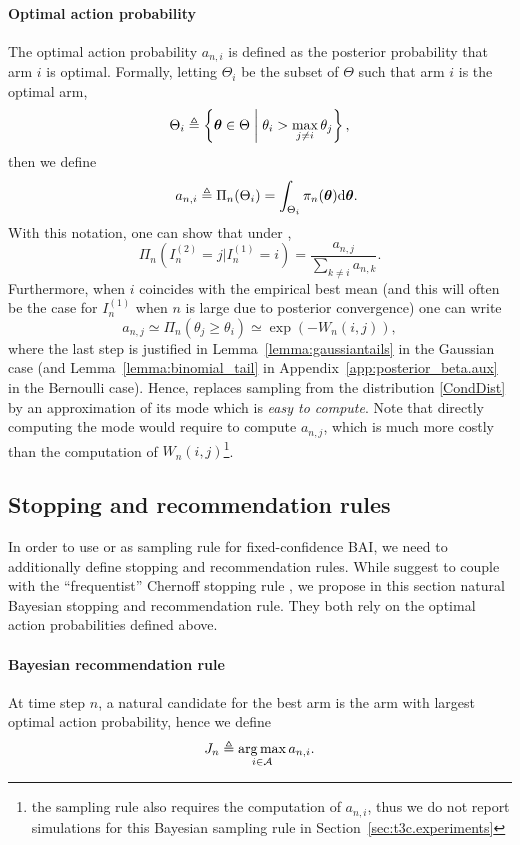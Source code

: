 \paragraph{Optimal action probability} The optimal action probability $a_{n,i}$ is defined as the posterior probability that arm $i$ is optimal. Formally, letting $\Theta_i$ be the subset of $\Theta$ such that arm $i$ is the optimal arm,
\[
    \Theta_i \triangleq \left\{ {\boldsymbol \theta}\in\Theta \biggm| \theta_i > \max_{j\neq i}\theta_j \right\},
\]
then we define
\[
   \quad a_{n,i} \triangleq \Pi_{n}(\Theta_i) = \int_{\Theta_i} \pi_n({\boldsymbol \theta}) \text{d} {\boldsymbol \theta}.
\]
With this notation, one can show that under \TTTS, 
\begin{equation}\label{CondDist}
    \Pi_n\left(I_n^{(2)} =j | I_n^{(1)} = i\right) = \frac{a_{n,j}}{\sum_{k\neq i} a_{n,k}}.
\end{equation}
Furthermore, when $i$ coincides with the empirical best mean (and this will often be the case for $I_n^{(1)}$ when $n$ is large due to posterior convergence) one can write 
\[a_{n,j} \simeq \Pi_n\left(\theta_j \geq \theta_{i}\right) \simeq \exp\left(-W_n(i,j)\right),\]
where the last step is justified in Lemma~\ref{lemma:gaussiantails} in the Gaussian case (and Lemma~\ref{lemma:binomial_tail} in Appendix~\ref{app:posterior_beta.aux} in the Bernoulli case). Hence, \TCC replaces sampling from the distribution \eqref{CondDist} by an approximation of its mode which is \emph{easy to compute}. Note that directly computing the mode would require to compute $a_{n,j}$, which is much more costly than the computation of $W_{n}(i,j)$\footnote{the \TTPS sampling rule \citep{russo2016ttts} also requires the computation of $a_{n,i}$, thus we do not report simulations for this Bayesian sampling rule in Section~\ref{sec:t3c.experiments}}. 

\subsection{Stopping and recommendation rules}

In order to use \TTTS or \TCC as sampling rule for fixed-confidence BAI, we need to additionally define stopping and recommendation rules. While \cite{qin2017ttei} suggest to couple \TTEI with the ``frequentist'' Chernoff stopping rule \citep{garivier2016tracknstop}, we propose in this section natural Bayesian stopping and recommendation rule. They both rely on the optimal action probabilities defined above.

\paragraph{Bayesian recommendation rule} At time step $n$, a natural candidate for the best arm is the arm with largest optimal action probability, hence we define 
\[
    J_n \triangleq \operatorname*{arg\,max}_{i\in\mathcal{A}} a_{n,i}.
\]

